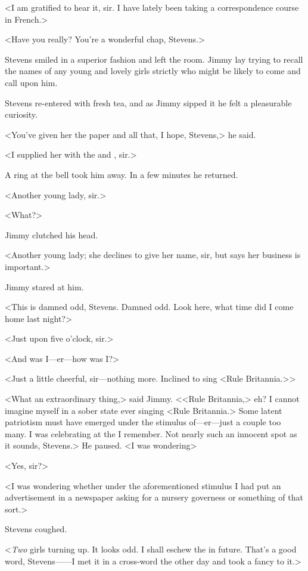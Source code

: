 <I am gratified to hear it, sir. I have lately been taking a correspondence course in French.>

<Have you really? You're a wonderful chap, Stevens.>

Stevens smiled in a superior fashion and left the room. Jimmy lay trying to recall the names of any young and lovely girls strictly  who might be likely to come and call upon him.

Stevens re-entered with fresh tea, and as Jimmy sipped it he felt a pleasurable curiosity.

<You've given her the paper and all that, I hope, Stevens,> he said.

<I supplied her with the  and , sir.>

A ring at the bell took him away. In a few minutes he returned.

<Another young lady, sir.>

<What?>

Jimmy clutched his head.

<Another young lady; she declines to give her name, sir, but says her business is important.>

Jimmy stared at him.

<This is damned odd, Stevens. Damned odd. Look here, what time did I come home last night?>

<Just upon five o'clock, sir.>

<And was I—er—how was I?>

<Just a little cheerful, sir—nothing more. Inclined to sing <Rule Britannia.>>

<What an extraordinary thing,> said Jimmy. <<Rule Britannia,> eh? I cannot imagine myself in a sober state ever singing <Rule Britannia.> Some latent patriotism must have emerged under the stimulus of—er—just a couple too many. I was celebrating at the  I remember. Not nearly such an innocent spot as it sounds, Stevens.> He paused. <I was wondering\longdash>

<Yes, sir?>

<I was wondering whether under the aforementioned stimulus I had put an advertisement in a newspaper asking for a nursery governess or something of that sort.>

Stevens coughed.

<\emph{Two} girls turning up. It looks odd. I shall eschew the  in future. That's a good word, Stevens——I met it in a cross-word the other day and took a fancy to it.>

